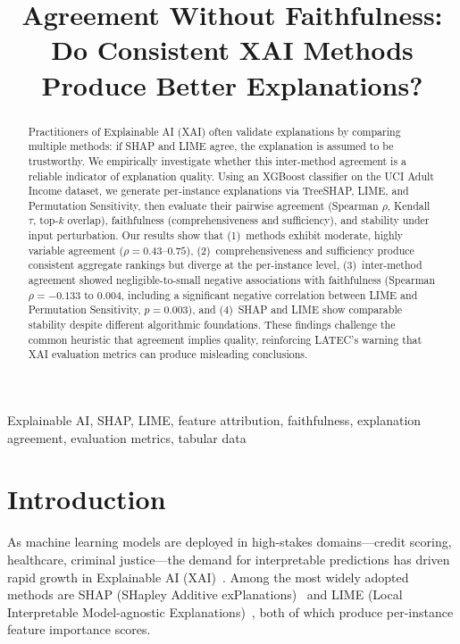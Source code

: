 \documentclass[conference, 10pt]{IEEEtran}
\title{Agreement Without Faithfulness:\\Do Consistent XAI Methods Produce Better Explanations?}
\author{
\IEEEauthorblockN{Angat Shah}
\IEEEauthorblockA{
Asha M. Tarsadia Institute of Computer Science and Technology (AMTICS)\\
Uka Tarsadia University\\
Bardoli, Gujarat, India\\
Email: angatshah1411@gmail.com}
}
\begin{document}
\maketitle

\begin{abstract}
Practitioners of Explainable AI (XAI) often validate explanations by comparing multiple methods: if SHAP and LIME agree, the explanation is assumed to be trustworthy. We empirically investigate whether this inter-method agreement is a reliable indicator of explanation quality. Using an XGBoost classifier on the UCI Adult Income dataset, we generate per-instance explanations via TreeSHAP, LIME, and Permutation Sensitivity, then evaluate their pairwise agreement (Spearman $\rho$, Kendall $\tau$, top-$k$ overlap), faithfulness (comprehensiveness and sufficiency), and stability under input perturbation. Our results show that (1)~methods exhibit moderate, highly variable agreement ($\rho = 0.43$--$0.75$), (2)~comprehensiveness and sufficiency produce consistent aggregate rankings but diverge at the per-instance level, (3)~inter-method agreement showed negligible-to-small negative associations with faithfulness (Spearman $\rho = -0.133$ to $0.004$, including a significant negative correlation between LIME and Permutation Sensitivity, $p = 0.003$), and (4)~SHAP and LIME show comparable stability despite different algorithmic foundations. These findings challenge the common heuristic that agreement implies quality, reinforcing LATEC's warning that XAI evaluation metrics can produce misleading conclusions.
\end{abstract}

\begin{IEEEkeywords}
Explainable AI, SHAP, LIME, feature attribution, faithfulness, explanation agreement, evaluation metrics, tabular data
\end{IEEEkeywords}

\section{Introduction}
\label{sec:introduction}

As machine learning models are deployed in high-stakes domains---credit scoring, healthcare, criminal justice---the demand for interpretable predictions has driven rapid growth in Explainable AI (XAI)~\cite{guidotti2018survey, molnar2020interpretable}. Among the most widely adopted methods are SHAP (SHapley Additive exPlanations)~\cite{lundberg2017shap} and LIME (Local Interpretable Model-agnostic Explanations)~\cite{ribeiro2016lime}, both of which produce per-instance feature importance scores.
\end{document}
